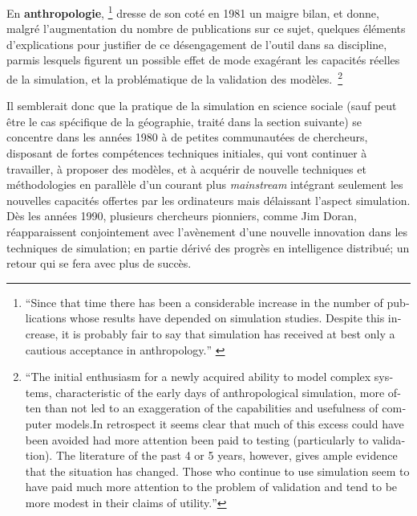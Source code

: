 En \textbf{anthropologie}, \autocite{Dyke1981} \footnote{ \foreignquote{english}{Since that time there has been a considerable increase in the number of publications whose results have depended on simulation studies. Despite this increase, it is probably fair to say that simulation has received at best only a cautious acceptance in anthropology.} \autocite{Dyke1981} } dresse de son coté en 1981 un maigre bilan, et donne, malgré l'augmentation du nombre de publications sur ce sujet, quelques éléments d'explications pour justifier de ce désengagement de l'outil dans sa discipline, parmis lesquels figurent un possible effet de mode exagérant les capacités réelles de la simulation, et la problématique de la validation des modèles. \footnote{\foreignquote{english}{The initial enthusiasm for a newly acquired ability to model complex systems, characteristic of the early days of anthropological simulation, more often than not led to an exaggeration of the capabilities and usefulness of computer models.In retrospect it seems clear that much of this excess could have been avoided had more attention been paid to testing (particularly to validation). The literature of the past 4 or 5 years, however, gives ample evidence that the situation has changed. Those who continue to use simulation seem to have paid much more attention to the problem of validation and tend to be more modest in their claims of utility.}}

Il semblerait donc que la pratique de la simulation en science sociale (sauf peut être le cas spécifique de la géographie, traité dans la section suivante) se concentre dans les années 1980 à de petites communautées de chercheurs, disposant de fortes compétences techniques initiales, qui vont continuer à travailler, à proposer des modèles, et à acquérir de nouvelle techniques et méthodologies en parallèle d'un courant plus \textit{mainstream} intégrant seulement les nouvelles capacités offertes par les ordinateurs mais délaissant l'aspect simulation. 
Dès les années 1990, plusieurs chercheurs pionniers, comme Jim Doran, réapparaissent conjointement avec l’avènement d'une nouvelle innovation dans les techniques de simulation; en partie dérivé des progrès en intelligence distribué; un retour qui se fera avec plus de succès.

